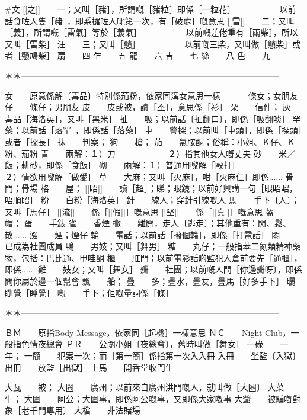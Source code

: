 #文 
[[之]]　　一；又叫［豬］，所謂嘅［豬粒］即係［一粒花］  
　　　　　以前話食咗人隻［豬］，即系攞咗人哋第一次，有［破處］嘅意思  
[[雷]]　　二；又叫［義］，所謂嘅［雷氣］等於［義氣］  
　　　　　以前嘅差佬重有［兩柴］，所以又叫［雷柴］  
汪　　三；又叫［戇］  
　　　　　以前嘅三柴，又叫做［戇柴］或者［戇鳩柴］  
扇　　四  
乍　　五  
龍　　六  
吉　　七  
絲　　八  
色　　九  
  
＊＊———————————————————————————————  
  
女　　原意係解〔毒品〕特別係茄粉，依家同溝女意思一樣  
　　　條女；女朋友  
仔　　條仔；男朋友  
皮　　皮或被，讀［丕］，意思係［衫］  
朵　　信件；  
灰　　毒品［海洛英］，又叫［黑米］  
扯　　吸；以前話〔扯翻口〕，即係［吸翻啖］  
罕　　藥；以前話［落罕］，即係話［落藥］  
車　　警探；以前叫［車頭］，即係［探頭］或者［探長］  
抹　　判案；  
狗　　槍；  
茄　　氯胺酮；俗稱：小姐、Ｋ仔、Ｋ粉、茄粉  
青　　兩解：１）刀  
　　　　　　２）指其他女人嘅丈夫  
砂　　米／飯；耕砂，即係［食飯］  
砌　　兩解：１）普通用嚟解［毆打］　  
　　　　　　２）情欲用嚟解［做愛］  
草　　大麻；又叫［火麻］，咁［火麻仁］即係......  
骨　　門；骨場  
格　　屋；  
[[眧]]　　讀［超］；睇；眼鏡；以前好興講一句［眼眧眧，唔順眧］  
粉　　白粉［海洛英］  
針　　線人；穿針引線嘅人  
馬　　手下〔人〕；又叫［馬仔］  
[[流]]　　係［[[假]]］嘅意思  
[[堅]]　　係［[[真]]］嘅意思  
盔　　帽；  
蛋　　手錶  
雀　　香煙  
撇　　離開，走人〔逃走〕；其他重有：閃、鬆、散......  
漒　　煙；煙仔  
輪　　電話；以前話［撥個輪］，即係［打電話］  
閹　　已成為社團成員  
鴨　　男妓；又叫［舞男］  
糖　　丸仔；一般指苯二氮類精神藥物，包括：巴比通、甲哇酮  
櫃　　肛門；以前電影話啲監犯入倉前要先［通櫃］，即係......  
雞　　妓女；又叫［舞女］  
瓣　　社團；以前嘅人問［你邊瓣呀〕，即係問你屬於邊一個幫會  
飄　　船；  
疊　　多；疊水，疊友，疊馬［好多手下］  
曬　　瞓覺［睡覺］  
𡃁　　手下；佢嘅量詞係［條］  
  
＊＊———————————————————————————————  
  
ＢＭ　　原指Body Message，依家同［起機］一樣意思  
ＮＣ　　Night Club，一般指色情夜總會  
ＰＲ　　公關小姐〔夜總會〕，舊時叫做［舞女］  
一碌　　一年；  
一簡　　犯案一次；而［第一簡］係指第一次入入冊  
入冊　　坐監〔入獄〕  
出冊　　放監［出獄］  
上馬　　開香堂收門生  
  
大瓦　　被；  
大圈　　廣州；以前來自廣州洪門嘅人，就叫做［大圈〕  
大菜　　牛；  
大圍　　阿公；大圍事，即係阿公嘅事，又即係大家嘅事  
大爺　　被騙嘅對象［老千門專用〕  
大檔　　非法賭場  
  
